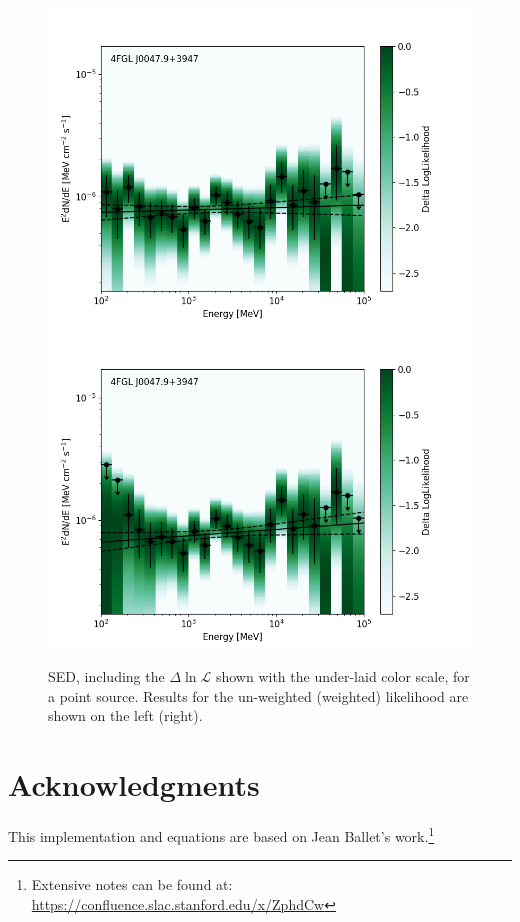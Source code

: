 \documentclass[preprint]{aastex}
\begin{document}
\begin{figure}[h]  
\begin{centering}
\includegraphics[width=0.49\columnwidth]{figures/sed_nowts.png}
\includegraphics[width=0.49\columnwidth]{figures/sed_wts.png}
\vspace{-0.10in}
\caption{\label{fig:sed}SED, including the $\Delta\ln\mathcal{L}$ shown
  with the under-laid color scale, for a point source. Results
  for the un-weighted (weighted) likelihood are shown on the left (right).}
\end{centering}
\end{figure}


\section{Acknowledgments}

This implementation and equations are based on 
Jean Ballet's work.\footnote{Extensive notes can be found at: \url{https://confluence.slac.stanford.edu/x/ZphdCw}}
\end{document}
